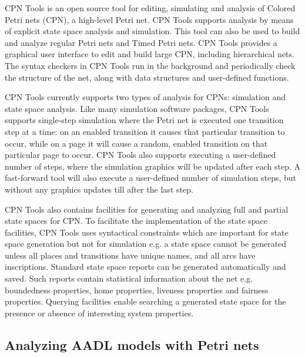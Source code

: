 CPN Tools \cite{CPNTools} is an open source tool for editing, simulating and analysis of Colored Petri nets (CPN), a high-level Petri net. CPN Tools supports analysis by means of explicit state space analysis and simulation. This tool can also be used to build and analyze regular Petri nets and Timed Petri nets. CPN Tools provides a graphical user interface to edit and build large CPN, including hierarchical nets. The syntax checkers in CPN Tools run in the background and periodically check the structure of the net, along with data structures and user-defined functions. 

CPN Tools currently supports two types of analysis for CPNs: simulation and state space analysis. Like many simulation software packages, CPN Tools supports single-step simulation where the Petri net is executed one transition step at a time: on an enabled transition it causes that particular transition to occur, while on a page it will cause a random, enabled transition on that particular page to occur. CPN Tools also supports executing a user-defined number of steps, where the simulation graphics will be updated after each step. A fast-forward tool will also execute a user-defined number of simulation steps, but without any graphics updates till after the last step. 

CPN Tools also contains facilities for generating and analyzing full and partial state spaces for CPN. To facilitate the implementation of the state space facilities, CPN Tools uses syntactical constraints which are important for state space generation but not for simulation e.g. a state space cannot be generated unless all places and transitions have unique names, and all arcs have inscriptions. Standard state space reports can be generated automatically and saved. Such reports contain statistical information about the net e.g. boundedness properties, home properties, liveness properties and fairness properties. Querying facilities enable searching a generated state space for the presence or absence of interesting system properties. 

\subsection{Analyzing AADL models with Petri nets}

